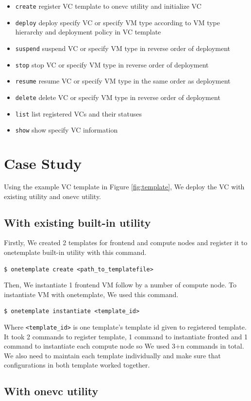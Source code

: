 \documentclass[conference]{IEEEtran}
\begin{document}
\begin{itemize}
\item \texttt{create} register VC template to onevc utility and initialize VC
\item \texttt{deploy} deploy specify VC or specify VM type according to VM type hierarchy and deployment policy in VC template
\item \texttt{suspend} suspend VC or specify VM type in reverse order of deployment
\item \texttt{stop} stop VC or specify VM type in reverse order of deployment
\item \texttt{resume} resume VC or specify VM type in the same order as deployment
\item \texttt{delete} delete VC or specify VM type in reverse order of deployment
\item \texttt{list} list registered VCs and their statuses
\item \texttt{show} show specify VC information
\end{itemize}

\section{Case Study}
Using the example VC template in Figure \ref{fig:template}, We deploy the VC with existing utility and onevc utility.

\subsection{With existing built-in utility}
Firstly, We created 2 templates for frontend and compute nodes and register it to onetemplate built-in utility with this command.

\texttt{\$ onetemplate create <path\_to\_templatefile>}

Then, We instantiate 1 frontend VM follow by a number of compute node.
To instantiate VM with onetemplate, We used this command.

\texttt{\$ onetemplate instantiate <template\_id>}

Where \texttt{<template\_id>} is one template's template id given to registered template.
It took 2 commands to register template, 1 command to instantiate fronted and 1 command to instantiate each compute node so We used 3+n commands in total.
We also need to maintain each template individually and make sure that configurations in both template worked together.

\subsection{With onevc utility}
\end{document}
